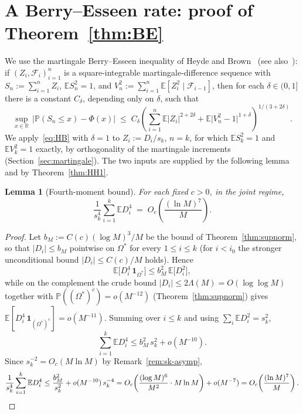 \documentclass[11pt]{article}
\newtheorem{lemma}[theorem]{Lemma}
\theoremstyle{remark}
\newcommand{\PP}{\mathbb{P}}
\newcommand{\EE}{\mathbb{E}}
\newcommand{\RR}{\mathbb{R}}
\newcommand{\F}{\mathcal{F}}
\newcommand{\one}{\mathbf{1}}
\begin{document}
\section{A Berry--Esseen rate: proof of Theorem~\ref{thm:BE}}\label{sec:BE}

We use the martingale Berry--Esseen inequality of Heyde and Brown~\cite{HeydeBrown} (see also~\cite[Thm.~3.7]{HH}): if $(Z_i, \F_i)_{i=1}^n$ is a square-integrable martingale-difference sequence with $S_n := \sum_{i=1}^n Z_i$, $\EE S_n^2 = 1$, and $V_n^2 := \sum_{i=1}^n \EE[Z_i^2 \mid \F_{i-1}]$, then for each $\delta \in (0, 1]$ there is a constant $C_\delta$, depending only on $\delta$, such that
\begin{equation}\label{eq:HB}
\sup_{x \in \RR}\, \bigl| \PP(S_n \leq x) - \Phi(x) \bigr|
\;\leq\;
C_\delta \left( \sum_{i=1}^n \EE |Z_i|^{2 + 2\delta} + \EE \bigl| V_n^2 - 1 \bigr|^{1 + \delta} \right)^{\!1/(3 + 2\delta)}.
\end{equation}
We apply~\eqref{eq:HB} with $\delta = 1$ to $Z_i := D_i/s_k$, $n = k$, for which $\EE S_k^2 = 1$ and $\EE V_k^2 = 1$ exactly, by orthogonality of the martingale increments (Section~\ref{sec:martingale}). The two inputs are supplied by the following lemma and by Theorem~\ref{thm:HH1}.

\begin{lemma}[Fourth-moment bound]\label{lem:fourth}
For each fixed $c > 0$, in the joint regime,
\[
\frac{1}{s_k^4} \sum_{i=1}^k \EE D_i^4 \;=\; O_c\!\left( \frac{(\ln M)^7}{M} \right).
\]
\end{lemma}

\begin{proof}
Let $b_M := C(c)(\log M)^3/M$ be the bound of Theorem~\ref{thm:supnorm}, so that $|D_i| \leq b_M$ pointwise on $\Omega^*$ for every $1 \leq i \leq k$ (for $i < i_0$ the stronger unconditional bound $|D_i| \leq C(c)/M$ holds). Hence
\[
\EE\bigl[ D_i^4\, \one_{\Omega^*} \bigr] \leq b_M^2\, \EE\bigl[ D_i^2 \bigr],
\]
while on the complement the crude bound $|D_i| \leq 2\Lambda(M) = O(\log\log M)$ together with $\PP((\Omega^*)^c) = o(M^{-12})$ (Theorem~\ref{thm:supnorm}) gives $\EE[D_i^4\, \one_{(\Omega^*)^c}] = o(M^{-11})$. Summing over $i \leq k$ and using $\sum_i \EE D_i^2 = s_k^2$,
\[
\sum_{i=1}^k \EE D_i^4 \leq b_M^2\, s_k^2 + o(M^{-10}).
\]
Since $s_k^{-2} = O_c(M \ln M)$ by Remark~\ref{rem:sk-asymp},
\[
\frac{1}{s_k^4} \sum_{i=1}^k \EE D_i^4
\leq \frac{b_M^2}{s_k^2} + o(M^{-10})\, s_k^{-4}
= O_c\!\left( \frac{(\log M)^6}{M^2} \cdot M \ln M \right) + o(M^{-7})
= O_c\!\left( \frac{(\ln M)^7}{M} \right). \qedhere
\]
\end{proof}
\end{document}
